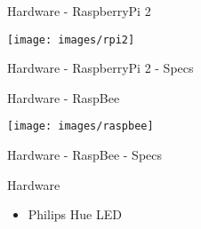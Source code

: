 \begin{frame}{Hardware - RaspberryPi 2}
  \begin{center}
    \texttt{[image: images/rpi2]}
  \end{center}
\end{frame}

\begin{frame}{Hardware - RaspberryPi 2 - Specs}
\end{frame}

\begin{frame}{Hardware - RaspBee}
  \begin{center}
    \texttt{[image: images/raspbee]}
  \end{center}
\end{frame}

\begin{frame}{Hardware - RaspBee - Specs}
\end{frame}

\begin{frame}{Hardware}
  \begin{itemize}
	\item Philips Hue LED
  \end{itemize}
\end{frame}